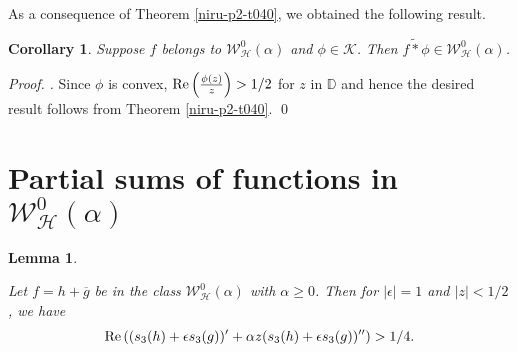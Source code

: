 \documentclass[a4paper,12pt]{amsart}
\theoremstyle{plain}
\newtheorem{cor}[equation]{Corollary}
\newtheorem{lem}[equation]{Lemma}
\theoremstyle{definition}
\newenvironment{pf}[1][]{ \vskip 3mm
 \noindent
 \ifthenelse{\equal{#1}{}}  {{\slshape Proof. }}  {{\slshape #1.} } }{\qed\bigskip}
\begin{document}
\noindent As a consequence of Theorem \ref{niru-p2-t040}, we obtained the following result.

\begin{cor}
Suppose $f$ belongs to $\mathcal{W}^0_{\mathcal{H}}(\alpha)$ and $\phi\in\mathcal{K}$. Then $f \tilde{*} \phi\in \mathcal{W}^0_{\mathcal{H}}(\alpha)$.
\end{cor}

\begin{pf}
Since $\phi$ is convex, ${\rm Re}\left(\frac{\phi(z)}{z}\right) > 1/2$ for $z$ in $\mathbb{D}$ and hence the desired result follows  from Theorem \ref{niru-p2-t040}.
\end{pf}

\section{Partial sums of functions in $\mathcal{W}^0_{\mathcal{H}}(\alpha)$}

\begin{lem}\label{niru-p2-l020}

Let $f = h + \overline{g}$ be in the class $\mathcal{W}^0_{\mathcal{H}}(\alpha)$ with $\alpha \geq 0$. Then for $|\epsilon| = 1$ and $|z|< 1/2$,  we have
$$
{\rm Re\,}((s_3(h) + \epsilon s_3(g))' + \alpha z(s_3(h) + \epsilon s_3(g))'')> 1/4.
$$

\end{lem}
\end{document}

